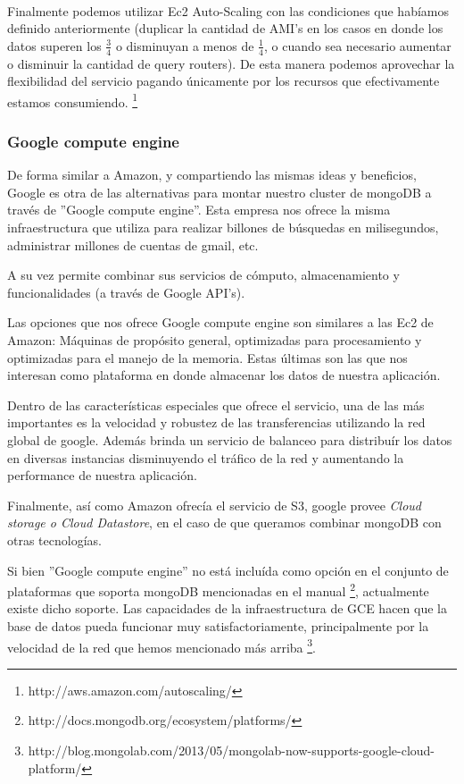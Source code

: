 ~

Finalmente podemos utilizar Ec2 Auto-Scaling con las condiciones que habíamos definido anteriormente (duplicar
la cantidad de AMI's en los casos en donde los datos superen los $\frac{3}{4}$ o disminuyan a menos de $\frac{1}{4}$,
o cuando sea necesario aumentar o disminuir la cantidad de query routers). De esta manera podemos aprovechar la 
flexibilidad del servicio pagando únicamente por los recursos que efectivamente estamos consumiendo.
\footnote{http://aws.amazon.com/autoscaling/}


\subsubsection{Google compute engine}

De forma similar a Amazon, y compartiendo las mismas ideas y beneficios, Google es otra de las alternativas para 
montar nuestro cluster de mongoDB a través de ''Google compute engine''. Esta empresa nos ofrece la misma 
infraestructura que utiliza para realizar billones de búsquedas en milisegundos, administrar millones de cuentas
de gmail, etc. 

A su vez permite combinar sus servicios de cómputo, almacenamiento y funcionalidades (a través de Google API's).

Las opciones que nos ofrece Google compute engine son similares a las Ec2 de Amazon: Máquinas de propósito general,
optimizadas para procesamiento y optimizadas para el manejo de la memoria. Estas últimas son las que nos interesan
como plataforma en donde almacenar los datos de nuestra aplicación.

Dentro de las características especiales que ofrece el servicio, una de las más importantes es la velocidad y robustez
de las transferencias utilizando la red global de google. Además brinda un servicio de balanceo para distribuír los 
datos en diversas instancias disminuyendo el tráfico de la red y aumentando la performance de nuestra aplicación.

Finalmente, así como Amazon ofrecía el servicio de S3, google provee \emph{Cloud storage o Cloud Datastore}, en el
caso de que queramos combinar mongoDB con otras tecnologías. 

Si bien ''Google compute engine'' no está incluída como opción en el conjunto de plataformas que soporta mongoDB 
mencionadas en el manual \footnote{http://docs.mongodb.org/ecosystem/platforms/}, actualmente existe dicho soporte. 
Las capacidades de la infraestructura de GCE hacen que la base de datos pueda funcionar muy satisfactoriamente, 
principalmente por la velocidad de la red que hemos mencionado más arriba
\footnote{http://blog.mongolab.com/2013/05/mongolab-now-supports-google-cloud-platform/}.

